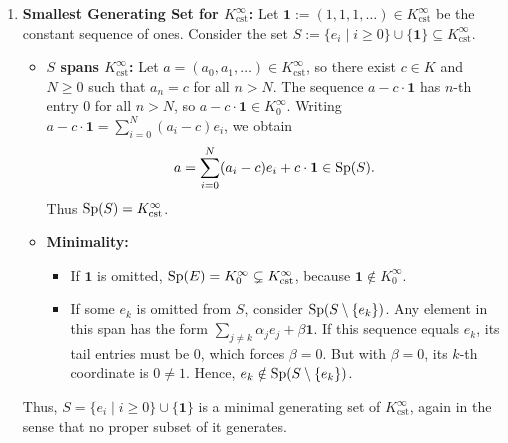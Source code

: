 \begin{exercisesolution}
\begin{enumerate}[label=\textbf{(\alph*)}]
    \item \textbf{Smallest Generating Set for $K_{\mathrm{cst}}^\infty$:}
    Let $\mathbf{1} := (1, 1, 1, \dots) \in K_{\mathrm{cst}}^\infty$ be the constant sequence of ones. Consider the set $S := \{e_i \mid i \ge 0\} \cup \{\mathbf{1}\} \subseteq K_{\mathrm{cst}}^\infty$.
    \begin{itemize}
        \item \textbf{$S$ spans $K_{\mathrm{cst}}^\infty$:} Let $a = (a_0, a_1, \dots) \in K_{\mathrm{cst}}^\infty$, so there exist $c \in K$ and $N \ge 0$ such that $a_n = c$ for all $n > N$. The sequence $a - c \cdot \mathbf{1}$ has $n$-th entry $0$ for all $n > N$, so $a - c \cdot \mathbf{1} \in K_0^\infty$. Writing $a - c \cdot \mathbf{1} = \sum_{i=0}^N (a_i - c) e_i$, we obtain
        \[
        a = \sum_{i=0}^N (a_i - c) e_i + c \cdot \mathbf{1} \in \operatorname{Sp}(S).
        \]
        Thus $\operatorname{Sp}(S) = K_{\mathrm{cst}}^\infty$.
        \item \textbf{Minimality:}
        \begin{itemize}
            \item If $\mathbf{1}$ is omitted, $\operatorname{Sp}(E) = K_0^\infty \subsetneq K_{\mathrm{cst}}^\infty$, because $\mathbf{1} \notin K_0^\infty$.
            \item If some $e_k$ is omitted from $S$, consider $\operatorname{Sp}(S \setminus \{e_k\})$. Any element in this span has the form $\sum_{j \ne k} \alpha_j e_j + \beta \mathbf{1}$. If this sequence equals $e_k$, its tail entries must be $0$, which forces $\beta = 0$. But with $\beta = 0$, its $k$-th coordinate is $0 \ne 1$. Hence, $e_k \notin \operatorname{Sp}(S \setminus \{e_k\})$.
        \end{itemize}
    \end{itemize}
    Thus, $S = \{e_i \mid i \ge 0\} \cup \{\mathbf{1}\}$ is a minimal generating set of $K_{\mathrm{cst}}^\infty$, again in the sense that no proper subset of it generates.
\end{enumerate}
\end{exercisesolution}
